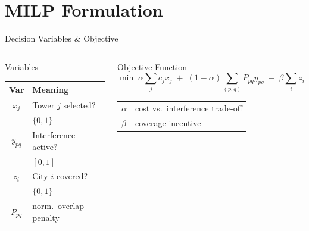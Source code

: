 \section{MILP Formulation}

\begin{frame}[t]{Decision Variables \& Objective}{}
    \begin{columns}[T]
        \begin{block}{Variables}
            \begin{tabular}{@{}c l@{}}
                \toprule
                \textbf{Var} & \textbf{Meaning} \\
                \midrule
                $x_j$   & Tower $j$ selected? \\[2pt]
                        & $\{0,1\}$ \\[6pt]
                $y_{pq}$ & Interference active? \\[2pt]
                         & $[0,1]$ \\[6pt]
                $z_i$    & City $i$ covered? \\[2pt]
                         & $\{0,1\}$ \\[6pt]
                $P_{pq}$ & norm.\ overlap penalty \\
                \bottomrule
            \end{tabular}
        \end{block}

        \begin{block}{Objective Function}
            \begin{equation*}
                \min \;
                \alpha\!\sum_{j} c_j x_j
                \;+\;
                (1-\alpha)\!\sum_{(p,q)} P_{pq} y_{pq}
                \;-\;
                \beta\!\sum_{i} z_i
            \end{equation*}

            \vspace{0.15cm}
            \begin{tabular}{@{}l l@{}}
                \textcolor{FAUGreen}{$\alpha$} & cost vs.\ interference trade-off \\
                \textcolor{FAUBlue}{$\beta$}  & coverage incentive \\
            \end{tabular}
        \end{block}
    \end{columns}


\end{frame}
